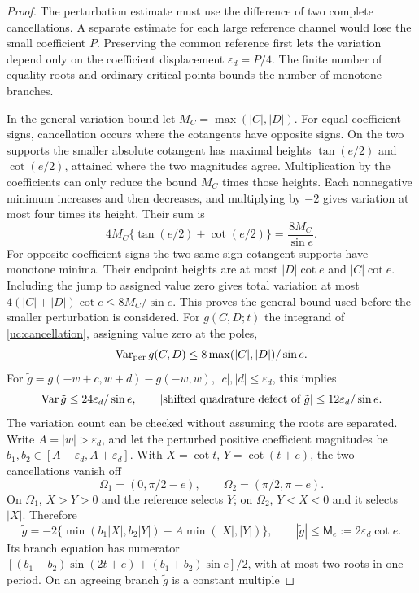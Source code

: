 \begin{proof}
The perturbation estimate must use the difference of two complete
cancellations. A separate estimate for each large reference channel
would lose the small coefficient $P$. Preserving the common reference
first lets the variation depend only on the coefficient displacement
$\varepsilon_d=P/4$. The finite number of equality roots and ordinary
critical points bounds the number of monotone branches.

In the general variation bound let $M_C=\max(|C|,|D|)$. For equal
coefficient signs, cancellation occurs where the cotangents have
opposite signs. On the two supports the smaller absolute cotangent
has maximal heights $\tan(e/2)$ and $\cot(e/2)$, attained where
the two magnitudes agree. Multiplication by the coefficients can only
reduce the bound $M_C$ times those heights. Each nonnegative minimum
increases and then decreases, and multiplying by $-2$ gives variation
at most four times its height. Their sum is
\[
 4M_C\{\tan(e/2)+\cot(e/2)\}=\frac{8M_C}{\sin e}.
\]
For opposite coefficient signs the two same-sign cotangent supports
have monotone minima. Their endpoint heights are at most
$|D|\cot e$ and $|C|\cot e$. Including the jump to assigned value
zero gives total variation at most
$4(|C|+|D|)\cot e\leq8M_C/\sin e$. This proves the general bound
used before the smaller perturbation is considered.
For $g(C,D;t)$ the integrand of \eqref{uc:cancellation}, assigning
value zero at the poles,
\[
 \operatorname{Var}_{\rm per}g(C,D)\leq
       8\max(|C|,|D|)/\sin e.
\]
For $\tilde g=g(-w+c,w+d)-g(-w,w)$, $|c|,|d|\leq\varepsilon_d$, this implies
\begin{equation}\label{uc:ordinary-variation}
 \operatorname{Var}\tilde g\leq24\varepsilon_d/\sin e,
 \qquad |\hbox{shifted quadrature defect of }\tilde g|
                  \leq12\varepsilon_d/\sin e.
\end{equation}
The variation count can be checked without assuming the roots are
separated. Write $A=|w|>\varepsilon_d$, and let the perturbed positive
coefficient magnitudes be $b_1,b_2\in[A-\varepsilon_d,A+\varepsilon_d]$.
With $X=\cot t$, $Y=\cot(t+e)$, the two cancellations vanish off
\[
 \Omega_1=(0,\pi/2-e),\qquad \Omega_2=(\pi/2,\pi-e).
\]
On $\Omega_1$, $X>Y>0$ and the reference selects $Y$; on $\Omega_2$,
$Y<X<0$ and it selects $|X|$. Therefore
\[
 \tilde g=-2\{\min(b_1|X|,b_2|Y|)-A\min(|X|,|Y|)\},
 \qquad |\tilde g|\leq \mathsf{M}_e:=2\varepsilon_d\cot e.
\]
Its branch equation has numerator
$[(b_1-b_2)\sin(2t+e)+(b_1+b_2)\sin e]/2$, with at most two
roots in one period. On an agreeing branch $\tilde g$ is a constant multiple

\end{proof}
